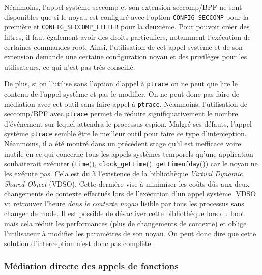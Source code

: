 Néanmoins, l'appel système seccomp et son extension seccomp/BPF ne sont
disponibles que si le noyau est configuré avec l'option \texttt{CONFIG\_SECCOMP}
pour la première et \texttt{CONFIG\_SECCOMP\_FILTER} pour la deuxième. Pour
pouvoir créer des filtres, il faut également avoir des droits particuliers,
notamment l'exécution de certaines commandes root. Ainsi, l'utilisation de cet
appel système et de son extension demande une certaine configuration noyau et
des privilèges pour les utilisateurs, ce qui n'est pas très conseillé.

De plus, si on l'utilise sans l'option d'appel à \texttt{ptrace} on ne peut que
lire le contenu de l'appel système et pas le modifier. On ne peut donc pas faire
de médiation avec cet outil sans faire appel à \texttt{ptrace}. Néanmoins,
l'utilisation de seccomp/BPF avec \texttt{ptrace} permet de réduire
signifiquativement le nombre d'événement sur lequel attendra le processus
espion.
\newline
Malgré ses défauts, l'appel système \texttt{ptrace} semble être le meilleur
outil pour faire ce type d'interception. Néanmoins, il a été montré dans un
précédent stage \citep{MARION:Interception} qu'il est inefficace voire inutile
en ce qui concerne tous les appels systèmes temporels qu'une application
souhaiterait exécuter (\texttt{time}(), \texttt{clock\_gettime}(),
\texttt{gettimeofday}()) car le noyau ne les exécute pas. Cela est du à
l'existence de la bibliothèque \textit{Virtual Dynamic Shared Object}
(VDSO). Cette dernière vise à minimiser les coûts dûs aux deux changements de
contexte effectués lors de l'exécution d'un appel système. VDSO va retrouver
l'heure \textit{{\color{red}dans le contexte noyau}} lisible par tous les
processus sans changer de mode. Il est possible de désactiver cette bibliothèque
lors du boot mais cela réduit les performances (plus de changements de contexte)
et oblige l'utilisateur à modifier les paramètres de son noyau. On peut donc
dire que cette solution d'interception n'est donc pas complète.


\subsubsection{Médiation directe des appels de fonctions}

